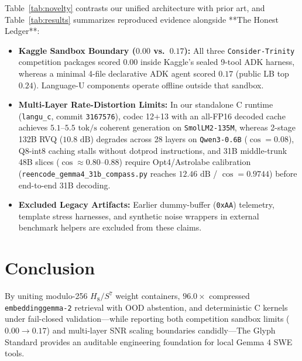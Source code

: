 \documentclass[10pt,twocolumn,letterpaper]{article}
\begin{document}
Table~\ref{tab:novelty} contrasts our unified architecture with prior art, and Table~\ref{tab:results} summarizes reproduced evidence alongside **The Honest Ledger**:
\begin{itemize}
  \item \textbf{Kaggle Sandbox Boundary ($0.00$ vs.\ $0.17$):} All three \texttt{Consider-Trinity} competition packages scored $0.00$ inside Kaggle's sealed 9-tool ADK harness, whereas a minimal 4-file declarative ADK agent scored $0.17$ (public LB top $0.24$). Language-U components operate offline outside that sandbox.
  \item \textbf{Multi-Layer Rate-Distortion Limits:} In our standalone C runtime (\texttt{langu\_c}, commit \texttt{3167576}), codec 12+13 with an all-FP16 decoded cache achieves $5.1\text{--}5.5\text{ tok/s}$ coherent generation on \texttt{SmolLM2-135M}, whereas 2-stage 132B RVQ ($10.8\text{ dB}$) degrades across 28 layers on \texttt{Qwen3-0.6B} ($\cos = 0.08$), Q8-int8 caching stalls without dotprod instructions, and 31B middle-trunk 48B slices ($\cos \approx 0.80\text{--}0.88$) require Opt4/Astrolabe calibration (\texttt{reencode\_gemma4\_31b\_compass.py} reaches $12.46\text{ dB}$ / $\cos=0.9744$) before end-to-end 31B decoding.
  \item \textbf{Excluded Legacy Artifacts:} Earlier dummy-buffer (\texttt{0xAA}) telemetry, template stress harnesses, and synthetic noise wrappers in external benchmark helpers are excluded from these claims.
\end{itemize}

\section{Conclusion}

By uniting modulo-256 $H_8/S^7$ weight containers, $96.0\times$ compressed \texttt{embeddinggemma-2} retrieval with OOD abstention, and deterministic C kernels under fail-closed validation---while reporting both competition sandbox limits ($0.00 \to 0.17$) and multi-layer SNR scaling boundaries candidly---The Glyph Standard provides an auditable engineering foundation for local Gemma 4 SWE tools.
\end{document}
